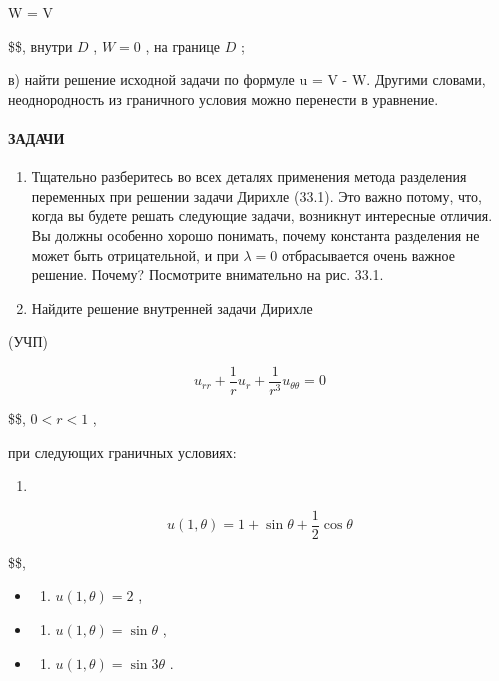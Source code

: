 \documentclass[
  ukrainian,
]{article}
\providecommand{\tightlist}{%
  \setlength{\itemsep}{0pt}\setlength{\parskip}{0pt}}
\begin{document}
 W =  V

\$\$, внутри \(D\) , \(W = 0\) , на границе \(D\) ;

в) найти решение исходной задачи по формуле u = V - W. Другими словами,
неоднородность из граничного условия можно перенести в уравнение.

\paragraph{ЗАДАЧИ}\label{ux437ux430ux434ux430ux447ux438-8}

\begin{enumerate}
\def\labelenumi{\arabic{enumi}.}
\item
  Тщательно разберитесь во всех деталях применения метода разделения
  переменных при решении задачи Дирихле (33.1). Это важно потому, что,
  когда вы будете решать следующие задачи, возникнут интересные отличия.
  Вы должны особенно хорошо понимать, почему константа разделения не
  может быть отрицательной, и при \(\lambda=0\) отбрасывается очень
  важное решение. Почему? Посмотрите внимательно на рис. 33.1.
\item
  Найдите решение внутренней задачи Дирихле
\end{enumerate}

(УЧП)

\[
u_{rr} + \frac{1}{r} u_r + \frac{1}{r^3} u_{\theta\theta} = 0
\]

\$\$, \(0 < r < 1\) ,

при следующих граничных условиях:

\begin{enumerate}
\def\labelenumi{\alph{enumi})}
\tightlist
\item
\end{enumerate}

\[
u(1, \theta) = 1 + \sin \theta + \frac{1}{2} \cos \theta
\]

\$\$,

\begin{itemize}
\tightlist
\item
  \begin{enumerate}
  \def\labelenumi{\arabic{enumi})}
  \setcounter{enumi}{5}
  \tightlist
  \item
    \(u(1, \theta) = 2\) ,
  \end{enumerate}
\item
  \begin{enumerate}
  \def\labelenumi{\Alph{enumi})}
  \setcounter{enumi}{1}
  \tightlist
  \item
    \(u(1, \theta) = \sin \theta\) ,
  \end{enumerate}
\item
  \begin{enumerate}
  \def\labelenumi{\alph{enumi})}
  \setcounter{enumi}{17}
  \tightlist
  \item
    \(u(1, \theta) = \sin 3\theta\) .
  \end{enumerate}
\end{itemize}
\end{document}

